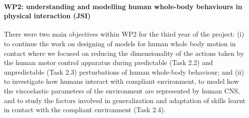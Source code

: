 \paragraph{WP2: understanding and modelling human whole-body behaviours in physical interaction (JSI)}

There were two main objectives within WP2 for the third year of the project: (i) to continue the work on designing of models for human whole body motion in contact where we focused on reducing the dimensionality of the actions taken by the human motor control apparatus during predictable (Task 2.2) and unpredictable (Task 2.3) perturbations of human whole-body behaviour; and (ii) to investigate how humans interact with compliant environment, to model how the viscoelastic parameters of the environment are represented by human CNS, and to study the factors involved in generalization and adaptation of skills learnt in contact with the compliant environment (Task 2.4).
